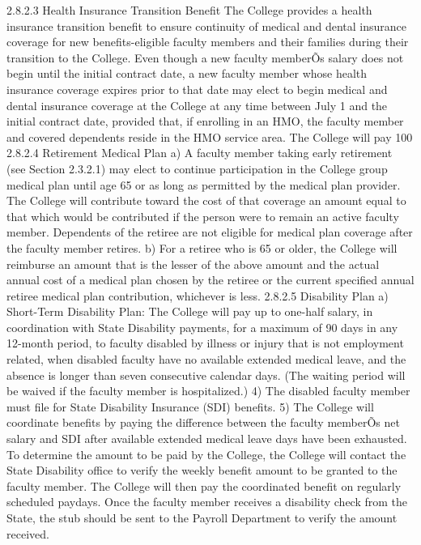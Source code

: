 \documentclass[letterpaper, 11pt]{article}
\begin{document}
	2.8.2.3 Health Insurance Transition Benefit
	The College provides a health insurance transition benefit to ensure continuity of medical and dental insurance coverage for new benefits-eligible faculty members and their families during their transition to the College.  Even though a new faculty memberÕs salary does not begin until the initial contract date, a new faculty member whose health insurance coverage expires prior to that date may elect to begin medical and dental insurance coverage at the College at any time between July 1 and the initial contract date, provided that, if enrolling in an HMO, the faculty member and covered dependents reside in the HMO service area.  The College will pay 100%
	2.8.2.4 Retirement Medical Plan
	a) A faculty member taking early retirement (see Section 2.3.2.1) may elect to continue participation in the College group medical plan until age 65 or as long as permitted by the medical plan provider.  The College will contribute toward the cost of that coverage an amount equal to that which would be contributed if the person were to remain an active faculty member.  Dependents of the retiree are not eligible for medical plan coverage after the faculty member retires.
	b) For a retiree who is 65 or older, the College will reimburse an amount that is the lesser of the above amount and the actual annual cost of a medical plan chosen by the retiree or the current specified annual retiree medical plan contribution, whichever is less.
	2.8.2.5 Disability Plan
	a) Short-Term Disability Plan:  The College will pay up to one-half salary, in coordination with State Disability payments, for a maximum of 90 days in any 12-month period, to faculty disabled by illness or injury that is not employment related, when disabled faculty have no available extended medical leave, and the absence is longer than seven consecutive calendar days.  (The waiting period will be waived if the faculty member is hospitalized.)
	4) The disabled faculty member must file for State Disability Insurance (SDI) benefits.
	5) The College will coordinate benefits by paying the difference between the faculty memberÕs net salary and SDI after available extended medical leave days have been exhausted.  To determine the amount to be paid by the College, the College will contact the State Disability office to verify the weekly benefit amount to be granted to the faculty member.  The College will then pay the coordinated benefit on regularly scheduled paydays.  Once the faculty member receives a disability check from the State, the stub should be sent to the Payroll Department to verify the amount received.
\end{document}
